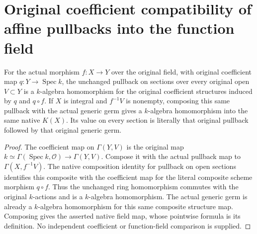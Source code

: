 \section{Original coefficient compatibility of affine pullbacks into the function field}
\label{sec:scheme-function-field-pullback-coefficients}

\begin{theorem}
\label{thm:scheme-function-field-pullback-coefficients}
\leanok
{}
For the actual morphism $f:X\to Y$ over the original field,
with original coefficient map $q:Y\to\operatorname{Spec}k$,
the unchanged pullback on sections over every original open
$V\subset Y$ is a $k$-algebra homomorphism for the original
coefficient structures induced by $q$ and $q\circ f$.
If $X$ is integral and $f^{-1}V$ is nonempty, composing this
same pullback with the actual generic germ gives a
$k$-algebra homomorphism into the same native $K(X)$.
Its value on every section is literally that original
pullback followed by that original generic germ.
\end{theorem}

\begin{proof}
The coefficient map on $\Gamma(Y,V)$ is the original map
$k\simeq\Gamma(\operatorname{Spec}k,\mathcal O)\to\Gamma(Y,V)$.
Compose it with the actual pullback map to
$\Gamma(X,f^{-1}V)$. The native composition identity for
pullback on open sections identifies this composite with
the coefficient map for the literal composite scheme
morphism $q\circ f$. Thus the unchanged ring homomorphism
commutes with the original $k$-actions and is a
$k$-algebra homomorphism. The actual generic germ is already
a $k$-algebra homomorphism for this same composite structure
map. Composing gives the asserted native field map, whose
pointwise formula is its definition. No independent
coefficient or function-field comparison is supplied.
\end{proof}
